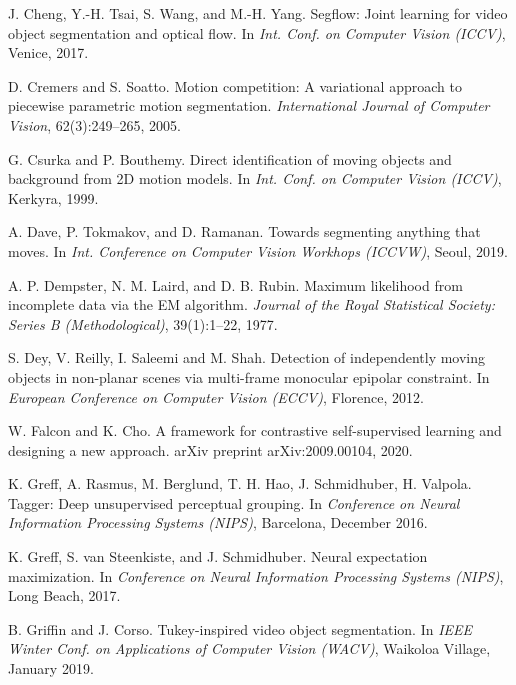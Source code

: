 \documentclass[10pt,twocolumn,letterpaper]{article}
\begin{document}
\begin{thebibliography}{28}
J. Cheng, Y.-H. Tsai, S. Wang, and M.-H. Yang.
\newblock Segflow: Joint learning for video object segmentation and optical flow.
\newblock In \emph{Int. Conf. on Computer Vision (ICCV)}, Venice, 2017.

D. Cremers and S. Soatto.
\newblock Motion competition: A variational approach to piecewise parametric motion segmentation.
\newblock \emph{International Journal of Computer Vision}, 62(3):249–265, 2005.

G. Csurka and P. Bouthemy.
\newblock Direct identification of moving objects and background
from 2D motion models.
\newblock In \emph{Int. Conf. on Computer Vision (ICCV)}, Kerkyra, 1999.

A. Dave, P. Tokmakov, and D. Ramanan.
\newblock Towards segmenting anything that moves. 
\newblock In \emph{Int. Conference on Computer Vision Workhops (ICCVW)}, Seoul, 2019.

A. P. Dempster, N. M. Laird, and D. B. Rubin.
\newblock Maximum likelihood from incomplete data via the EM algorithm.
\newblock \emph{Journal of the Royal Statistical Society: Series B
(Methodological)}, 39(1):1–22, 1977.

S. Dey, V. Reilly, I. Saleemi and M. Shah.
\newblock Detection of independently moving objects in non-planar scenes via multi-frame monocular epipolar constraint.
\newblock In \emph{European Conference on Computer Vision (ECCV)}, Florence, 2012.

W. Falcon and K. Cho.
\newblock A framework for contrastive self-supervised learning and designing a new approach.
\newblock arXiv preprint arXiv:2009.00104, 2020.



K. Greff, A. Rasmus, M. Berglund, T. H. Hao, J. Schmidhuber, H. Valpola.
\newblock Tagger: Deep unsupervised perceptual grouping.
\newblock In \emph{Conference on Neural Information Processing Systems (NIPS)}, Barcelona, December 2016.

K. Greff, S. van Steenkiste, and J. Schmidhuber.
\newblock Neural expectation maximization.
\newblock In \emph{Conference on Neural Information Processing Systems (NIPS)}, Long Beach, 2017.

B. Griffin and J. Corso.
\newblock Tukey-inspired video object segmentation.
\newblock In \emph{IEEE Winter Conf. on Applications of Computer Vision (WACV)}, Waikoloa Village, January 2019.





\end{thebibliography}
\end{document}
